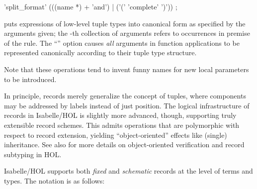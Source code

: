 \begin{isabellebody}
\begin{isamarkuptext}
  \begin{rail}
    'split\_format' (((name *) + 'and') | ('(' 'complete' ')'))
    ;
  \end{rail}

  \begin{descr}
  
  \item [\hyperlink{attribute.HOL.split-format}{\mbox{\isa{split{\isacharunderscore}format}}}~\isa{{\isachardoublequote}p\isactrlsub {\isadigit{1}}\ {\isasymdots}\ p\isactrlsub m\ {\isasymAND}\ {\isasymdots}\ {\isasymAND}\ q\isactrlsub {\isadigit{1}}\ {\isasymdots}\ q\isactrlsub n{\isachardoublequote}}] puts expressions of
  low-level tuple types into canonical form as specified by the
  arguments given; the -th collection of arguments refers to
  occurrences in premise  of the rule.  The ``'' option causes \emph{all} arguments in function
  applications to be represented canonically according to their tuple
  type structure.

  Note that these operations tend to invent funny names for new local
  parameters to be introduced.

  \end{descr}%
\end{isamarkuptext}%
\isamarkuptrue%
%
\isamarkuptrue%
%
\begin{isamarkuptext}%
In principle, records merely generalize the concept of tuples, where
  components may be addressed by labels instead of just position.  The
  logical infrastructure of records in Isabelle/HOL is slightly more
  advanced, though, supporting truly extensible record schemes.  This
  admits operations that are polymorphic with respect to record
  extension, yielding ``object-oriented'' effects like (single)
  inheritance.  See also \cite{NaraschewskiW-TPHOLs98} for more
  details on object-oriented verification and record subtyping in HOL.%
\end{isamarkuptext}%
\isamarkuptrue%
%
\isamarkuptrue%
%
\begin{isamarkuptext}%
Isabelle/HOL supports both \emph{fixed} and \emph{schematic} records
  at the level of terms and types.  The notation is as follows:


\end{isamarkuptext}
\end{isabellebody}
